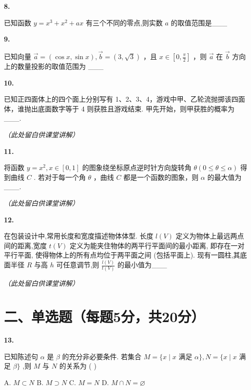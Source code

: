 \documentclass[10pt]{article}
\newcommand{\boardspace}[1]{%
  \par\vspace{#1}
}
\newcommand{\hardboardspace}{%
  \par\vspace{5cm}
  \hfill\textit{（此处留白供课堂讲解）}
  \par\vspace{1cm}
}
\newenvironment{questionblock}[1]{%
  \needspace{3\baselineskip}%
  \noindent\textbf{#1.}%
}{%
  \par\vspace{1em}%
}
\begin{document}
\begin{questionblock}{8}
已知函数 \(y = {x}^{3} + {x}^{2} + {ax}\) 有三个不同的零点,则实数 \(a\) 的取值范围是___
\end{questionblock}

\boardspace{1.5cm}

\begin{questionblock}{9}
已知向量 \(\overrightarrow{a} = \left( {\cos x,\sin x}\right) ,\overrightarrow{b} = \left( {3,\sqrt{3}}\right)\) ，且 \(x \in  \left\lbrack  {0,\frac{\pi }{2}}\right\rbrack\) ，则 \(\overrightarrow{a}\) 在 \(\overrightarrow{b}\) 方向上的数量投影的取值范围为 ___
\end{questionblock}

\boardspace{1.5cm}

\begin{questionblock}{10}
已知正四面体上的四个面上分别写有 1、2、3、4，游戏中甲、乙轮流抛掷该四面体，谁抛出底面数字等于 4 则获胜且游戏结束. 甲先开始，则甲获胜的概率为___.
\end{questionblock}

\hardboardspace

\begin{questionblock}{11}
将函数 \(y = {x}^{2}, x \in  \left\lbrack  {0,1}\right\rbrack\) 的图象绕坐标原点逆时针方向旋转角 \(\theta \left( {0 \leq  \theta  \leq  \alpha }\right)\) 得到曲线 \(C\) . 若对于每一个角 \(\theta\) ，曲线 \(C\) 都是一个函数的图象，则 \(\alpha\) 的最大值为___.
\end{questionblock}

\hardboardspace

\begin{questionblock}{12}
在包装设计中,常用长度和宽度描述物体体型. 长度 \(l\left( V\right)\) 定义为物体上最远两点间的距离,宽度 \(t\left( V\right)\) 定义为能夹住物体的两平行平面间的最小距离, 即存在一对平行平面, 使得物体上的所有点均位于两平面之间 (包括平面上). 现有一圆柱,其底面半径 \(R\) 与高 \(h\) 可任意调节,则 \(\frac{l\left( V\right) }{t\left( V\right) }\) 的最小值为___
\end{questionblock}

\hardboardspace

\section*{二、单选题（每题5分，共20分）}

\begin{questionblock}{13}
已知陈述句 \(\alpha\) 是 \(\beta\) 的充分非必要条件. 若集合 \(M = \{ x \mid  x\) 满足 \(\alpha \} , N = \{ x \mid  x\) 满足 \(\beta \}\) ,则 \(M\) 与 \(N\) 的关系为 ( )

A. \(M \subset  N\) B. \(M \supset  N\) C. \(M = N\) D. \(M \cap  N = \varnothing\)
\end{questionblock}
\end{document}
